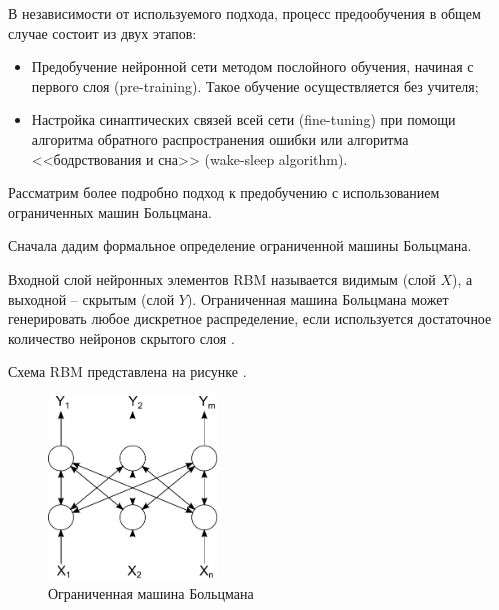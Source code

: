 В независимости от используемого подхода, процесс предообучения в общем случае состоит из двух этапов: 
\begin{itemize}
	\item Предобучение нейронной сети методом послойного обучения, начиная с первого слоя  (pre-training). Такое обучение осуществляется без учителя;
	\item Настройка синаптических связей всей сети (fine-tuning) при помощи алгоритма обратного распространения ошибки или алгоритма <<бодрствования и сна>> (wake-sleep algorithm).
\end{itemize}

Рассматрим более подробно подход к предобучению с использованием ограниченных машин Больцмана.

Сначала дадим формальное определение ограниченной машины Больцмана.

\begin{SCn}
\end{SCn}

Входной слой нейронных элементов RBM называется видимым (слой $X$), а выходной -- скрытым (слой $Y$). Ограниченная машина Больцмана может генерировать любое дискретное распределение, если используется достаточное количество нейронов скрытого слоя .

Схема RBM представлена на рисунке \textit{}.

\begin{figure}[H]
	\includegraphics[width=0.4\textwidth]{author/part3/figures/pic1-3.pdf}
	\caption{Ограниченная машина Больцмана}
	\label{fig:rbm_scheme}
\end{figure}

